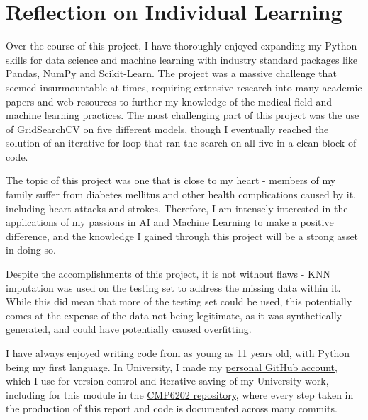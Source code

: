 \documentclass[12pt]{report}
\newcommand{\para}{\vspace{8pt}\noindent}
\begin{document}
\pagebreak 
\section{Reflection on Individual Learning}

Over the course of this project, I have thoroughly enjoyed expanding
my Python skills for data science and machine learning with industry standard packages like Pandas, NumPy and Scikit-Learn. 
The project was a massive challenge that seemed insurmountable at times, requiring extensive research into many academic papers and web resources to further my
knowledge of the medical field and machine learning practices. The most challenging part of this project was the use of GridSearchCV on five different
models, though I eventually reached the solution of an iterative for-loop that ran the search on all five in a clean block of code.

\para The topic of this project was one 
that is close to my heart - members of my family suffer from diabetes mellitus and other health complications caused by it,
including heart attacks and strokes. Therefore, I am intensely interested in the applications of my passions in AI and Machine Learning
to make a positive difference, and the knowledge I gained through this project will be a strong asset in doing so.

\para Despite the accomplishments of this project, it is not without flaws - KNN imputation was used on the testing set to address 
the missing data within it. While this did mean that more of the testing set could be used, this potentially comes at the expense of 
the data not being legitimate, as it was synthetically generated, and could have potentially caused overfitting.

\para I have always enjoyed writing code from as young as 11 years old, with Python being my first language.
In University, I made my \href{https://github.com/LewGoesB00M}{personal GitHub account}, which I use for version control and iterative 
saving of my University work, including for this module in the \href{https://github.com/LewGoesB00M/CMP6202}{CMP6202 repository}, 
where every step taken in the production of this report and code is documented across many commits.
\end{document}
